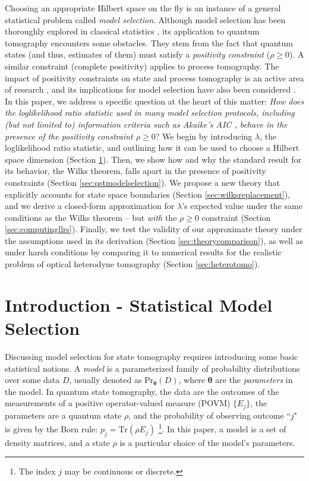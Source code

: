 \documentclass[aps,pra, twocolumn]{revtex4-1}
\newcommand{\bs}[1]{\boldsymbol{#1}}
\begin{document}
Choosing an appropriate Hilbert space on the fly is an instance of a general statistical problem called \emph{model selection}.  Although model selection has been thoroughly explored in classical statistics \cite{Burnham2004}, its application to quantum tomography encounters some obstacles.  They stem from the fact that quantum states (and thus, estimates of them) must satisfy a \emph{positivity constraint} ($\rho\geq0$).  A similar constraint (complete positivity) applies to process tomography.  The impact of positivity constraints on state and process tomography is an active area of research \cite{Candes2006, Flammia2012a, Suess2016, Carpentier2015}, and its implications for model selection have also been considered \cite{Schwarz2013a, Guta2012a, VanEnk2013a, Langford2013, Yin2011, Moroder2013, Knips2015}.  In this paper, we address a specific question at the heart of this matter:  \emph{How does the loglikelihood ratio statistic used in many model selection protocols, including (but not limited to) information criteria such as Akaike's AIC \cite{Akaike1974}, behave in the presence of the positivity constraint $\rho\geq0$}?  We begin by introducing $\lambda$, the loglikelihood ratio statistic, and outlining how it can be used to choose a Hilbert space dimension (Section \ref{sec:intro}).  Then, we show how and why the standard result for its behavior, the Wilks theorem, falls apart in the presence of positivity constraints (Section \ref{sec:qstmodelselection}).  We propose a new theory that explicitly accounts for state space boundaries (Section \ref{sec:wilksreplacement}), and we derive a closed-form approximation for $\lambda$'s expected value under the same conditions as the Wilks theorem -- but \emph{with} the $\rho\geq0$ constraint (Section \ref{sec:computingllrs}).  Finally, we test the validity of our approximate theory under the assumptions used in its derivation (Section \ref{sec:theorycomparison}), as well as under harsh conditions by comparing it to numerical results for the realistic problem of optical heterodyne tomography (Section \ref{sec:heterotomo}).

\section{Introduction - Statistical Model Selection}
\label{sec:intro}
Discussing model selection for state tomography requires introducing some basic statistical notions.  A \emph{model} is a parameterized family of probability distributions over some data $D$, usually denoted as $\mathrm{Pr}_{\bs{\theta}}(D)$, where $\bs{\theta}$ are the \emph{parameters} in the model. In quantum state tomography, the data are the outcomes of the measurements of a positive operator-valued measure (POVM) $\{E_{j}\}$, the parameters are a quantum state $\rho$, and the probability of observing outcome ``$j$" is given by the Born rule: $p_{j} = \mathrm{Tr}(\rho E_{j})$ \footnote{The index $j$ may be continuous or discrete.}. In this paper, a model is a set of density matrices, and a state $\rho$ is a particular choice of the model's parameters.
\end{document}
